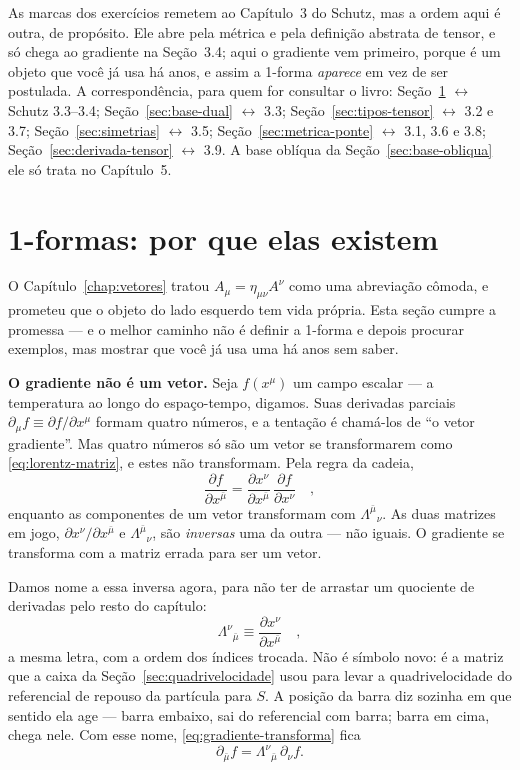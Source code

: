 \documentclass[12pt,a4paper,oneside]{book}
\theoremstyle{rgplain}
\theoremstyle{rgremark}
\begin{document}
\begin{leitura}
As marcas dos exercícios remetem ao Capítulo~3 do Schutz, mas a ordem aqui é
outra, de propósito. Ele abre pela métrica e pela definição abstrata de tensor,
e só chega ao gradiente na Seção~3.4; aqui o gradiente vem primeiro, porque é
um objeto que você já usa há anos, e assim a 1-forma \emph{aparece} em vez de
ser postulada. A correspondência, para quem for consultar o livro:
Seção~\ref{sec:umaformas} $\leftrightarrow$ Schutz 3.3--3.4;
Seção~\ref{sec:base-dual} $\leftrightarrow$ 3.3;
Seção~\ref{sec:tipos-tensor} $\leftrightarrow$ 3.2 e 3.7;
Seção~\ref{sec:simetrias} $\leftrightarrow$ 3.5;
Seção~\ref{sec:metrica-ponte} $\leftrightarrow$ 3.1, 3.6 e 3.8;
Seção~\ref{sec:derivada-tensor} $\leftrightarrow$ 3.9. A base oblíqua da
Seção~\ref{sec:base-obliqua} ele só trata no Capítulo~5.
\end{leitura}

\section{1-formas: por que elas existem}
\label{sec:umaformas}

O Capítulo~\ref{chap:vetores} tratou $A_\mu=\eta_{\mu\nu}A^\nu$ como uma
abreviação cômoda, e prometeu que o objeto do lado esquerdo tem vida própria.
Esta seção cumpre a promessa --- e o melhor caminho não é definir a 1-forma e
depois procurar exemplos, mas mostrar que você já usa uma há anos sem saber.

\textbf{O gradiente não é um vetor.} Seja $f(x^\mu)$ um campo escalar --- a
temperatura ao longo do espaço-tempo, digamos. Suas derivadas parciais
$\partial_\mu f\equiv\partial f/\partial x^\mu$ formam quatro números, e a
tentação é chamá-los de ``o vetor gradiente''. Mas quatro números só são um
vetor se transformarem como \eqref{eq:lorentz-matriz}, e estes não
transformam. Pela regra da cadeia,
\begin{equation}
  \frac{\partial f}{\partial x^{\bar\mu}}
  =\frac{\partial x^\nu}{\partial x^{\bar\mu}}\,\frac{\partial f}{\partial x^\nu}\quad,
  \label{eq:gradiente-transforma}
\end{equation}
enquanto as componentes de um vetor transformam com $\Lambda^{\bar\mu}{}_\nu$.
As duas matrizes em jogo, $\partial x^\nu/\partial x^{\bar\mu}$ e
$\Lambda^{\bar\mu}{}_\nu$, são \emph{inversas} uma da outra --- não iguais. O
gradiente se transforma com a matriz errada para ser um vetor.

Damos nome a essa inversa agora, para não ter de arrastar um quociente de
derivadas pelo resto do capítulo:
\begin{equation}
  \Lambda^{\nu}{}_{\bar\mu}\equiv\frac{\partial x^\nu}{\partial x^{\bar\mu}}\quad,
  \label{eq:lambda-inversa}
\end{equation}
a mesma letra, com a ordem dos índices trocada. Não é símbolo novo: é a matriz
que a caixa da Seção~\ref{sec:quadrivelocidade} usou para levar a
quadrivelocidade do referencial de repouso da partícula para $S$. A posição da
barra diz sozinha em que sentido ela age --- barra embaixo, sai do referencial
com barra; barra em cima, chega nele. Com esse nome,
\eqref{eq:gradiente-transforma} fica
\[
  \partial_{\bar\mu}f=\Lambda^{\nu}{}_{\bar\mu}\,\partial_\nu f .
\]
\end{document}
